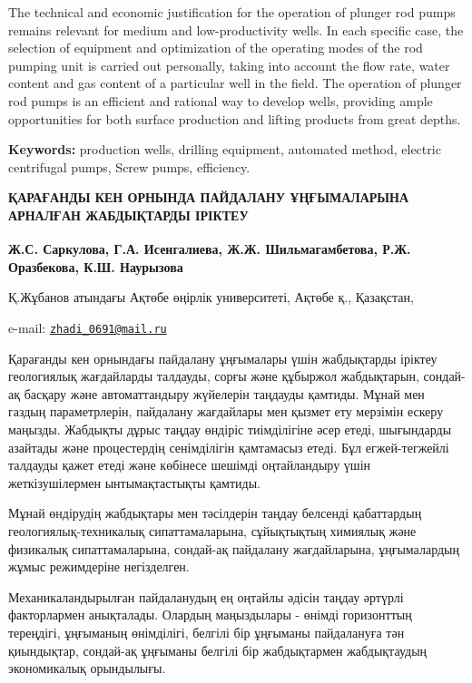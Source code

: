 The technical and economic justification for the operation of plunger
rod pumps remains relevant for medium and low-productivity wells. In
each specific case, the selection of equipment and optimization of the
operating modes of the rod pumping unit is carried out personally,
taking into account the flow rate, water content and gas content of a
particular well in the field. The operation of plunger rod pumps is an
efficient and rational way to develop wells, providing ample
opportunities for both surface production and lifting products from
great depths.

{\bfseries Keywords:} production wells, drilling equipment, automated
method, electric centrifugal pumps, Screw pumps, efficiency.

\begin{articleheader}
{\bfseries ҚАРАҒАНДЫ КЕН ОРНЫНДА ПАЙДАЛАНУ ҰҢҒЫМАЛАРЫНА АРНАЛҒАН
ЖАБДЫҚТАРДЫ ІРІКТЕУ}

{\bfseries
Ж.С. Саркулова\textsuperscript{\envelope },
Г.А. Исенгалиева,
Ж.Ж. Шильмагамбетова,
Р.Ж. Оразбекова,
К.Ш. Наурызова
}
\end{articleheader}

\begin{affiliation}
Қ.Жұбанов атындағы Ақтөбе өңірлік университеті, Ақтөбе қ., Қазақстан,

e-mail: \href{mailto:zhadi\_0691@mail.ru}{\nolinkurl{zhadi\_0691@mail.ru}}
\end{affiliation}

Қарағанды кен орнындағы пайдалану ұңғымалары үшін жабдықтарды іріктеу
геологиялық жағдайларды талдауды, сорғы және құбыржол жабдықтарын,
сондай-ақ басқару және автоматтандыру жүйелерін таңдауды қамтиды. Мұнай
мен газдың параметрлерін, пайдалану жағдайлары мен қызмет ету мерзімін
ескеру маңызды. Жабдықты дұрыс таңдау өндіріс тиімділігіне әсер етеді,
шығындарды азайтады және процестердің сенімділігін қамтамасыз етеді. Бұл
егжей-тегжейлі талдауды қажет етеді және көбінесе шешімді оңтайландыру
үшін жеткізушілермен ынтымақтастықты қамтиды.

Мұнай өндірудің жабдықтары мен тәсілдерін таңдау белсенді қабаттардың
геологиялық-техника\-лық сипаттамаларына, сұйықтықтың химиялық және
физикалық сипаттамаларына, сондай-ақ пайдалану жағдайларына,
ұңғымалардың жұмыс режимдеріне негізделген.

Механикаландырылған пайдаланудың ең оңтайлы әдісін таңдау әртүрлі
факторлармен анықталады. Олардың маңыздылары - өнімді горизонттың
тереңдігі, ұңғыманың өнімділігі, белгілі бір ұңғыманы пайдалануға тән
қиындықтар, сондай-ақ ұңғыманы белгілі бір жабдықтармен жабдықтаудың
экономикалық орындылығы.

